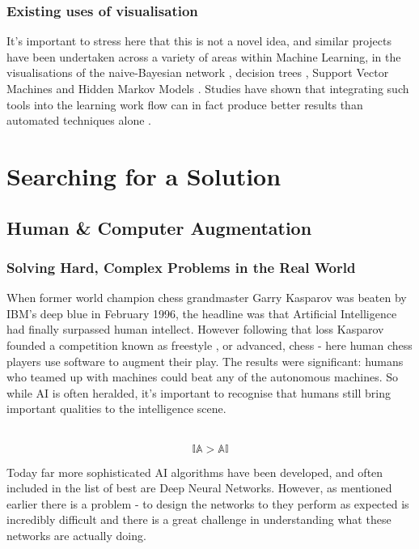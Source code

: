 \documentclass[a4paper,11pt,titlepage]{article}
\begin{document}
\subsubsection{Existing uses of visualisation}
	It's important to stress here that this is not a novel idea, and similar projects have been undertaken across a variety of areas within Machine Learning, in the visualisations of the naive-Bayesian network \cite{Becker2001}, decision trees \cite{Ankerst1999}, Support Vector Machines \cite{Caragea2001} and Hidden Markov Models \cite{Dai2008}. Studies have shown that integrating such tools into the learning work flow can in fact produce better results than automated techniques alone \cite{Ware2002}.

\clearpage 

\section{Searching for a Solution}
	\subsection{Human \& Computer Augmentation}

\subsubsection{Solving Hard, Complex Problems in the Real World}

When former world champion chess grandmaster Garry Kasparov was beaten by IBM’s deep blue in February 1996, the headline was that Artificial Intelligence had finally surpassed human intellect. However following that loss Kasparov founded a competition known as freestyle , or advanced, chess - here human chess players use software to augment their play. The results were significant: humans who teamed up with machines could beat any of the autonomous machines. So while AI is often heralded, it's important to recognise that humans still bring important qualities to the intelligence scene. 
\\\

		$$
			\mathbb{IA} > \mathbb{AI}
		$$
	
Today far more sophisticated AI algorithms have been developed, and often included in the list of best are Deep Neural Networks. However, as mentioned earlier there is a problem - to design the networks to they perform as expected is incredibly difficult and there is a great challenge in understanding what these networks are actually doing. 
\end{document}
